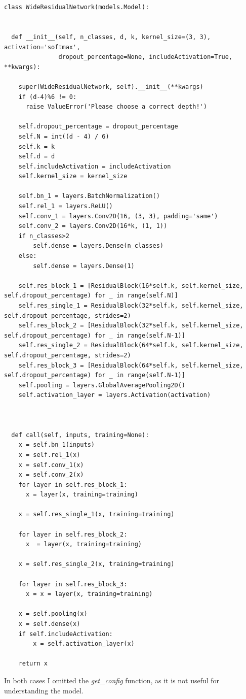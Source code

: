 \begin{lstlisting}


class WideResidualNetwork(models.Model):


  def __init__(self, n_classes, d, k, kernel_size=(3, 3), activation='softmax',
               dropout_percentage=None, includeActivation=True, **kwargs):

    super(WideResidualNetwork, self).__init__(**kwargs)
    if (d-4)%6 != 0:
      raise ValueError('Please choose a correct depth!')

    self.dropout_percentage = dropout_percentage
    self.N = int((d - 4) / 6)
    self.k = k
    self.d = d
    self.includeActivation = includeActivation
    self.kernel_size = kernel_size

    self.bn_1 = layers.BatchNormalization()
    self.rel_1 = layers.ReLU()
    self.conv_1 = layers.Conv2D(16, (3, 3), padding='same')
    self.conv_2 = layers.Conv2D(16*k, (1, 1))
    if n_classes>2
        self.dense = layers.Dense(n_classes)
    else:
        self.dense = layers.Dense(1)

    self.res_block_1 = [ResidualBlock(16*self.k, self.kernel_size,  self.dropout_percentage) for _ in range(self.N)]
    self.res_single_1 = ResidualBlock(32*self.k, self.kernel_size,  self.dropout_percentage, strides=2)
    self.res_block_2 = [ResidualBlock(32*self.k, self.kernel_size,  self.dropout_percentage) for _ in range(self.N-1)]
    self.res_single_2 = ResidualBlock(64*self.k, self.kernel_size,  self.dropout_percentage, strides=2)
    self.res_block_3 = [ResidualBlock(64*self.k, self.kernel_size,  self.dropout_percentage) for _ in range(self.N-1)]
    self.pooling = layers.GlobalAveragePooling2D()
    self.activation_layer = layers.Activation(activation)



  def call(self, inputs, training=None):
    x = self.bn_1(inputs)
    x = self.rel_1(x)
    x = self.conv_1(x)
    x = self.conv_2(x)
    for layer in self.res_block_1:
      x = layer(x, training=training)

    x = self.res_single_1(x, training=training)

    for layer in self.res_block_2:
      x  = layer(x, training=training)

    x = self.res_single_2(x, training=training)

    for layer in self.res_block_3:
      x = x = layer(x, training=training)

    x = self.pooling(x)
    x = self.dense(x)
    if self.includeActivation:
        x = self.activation_layer(x)

    return x

\end{lstlisting}

In both cases I omitted the \textit{get\_config} function, as it is not useful for understanding the model.